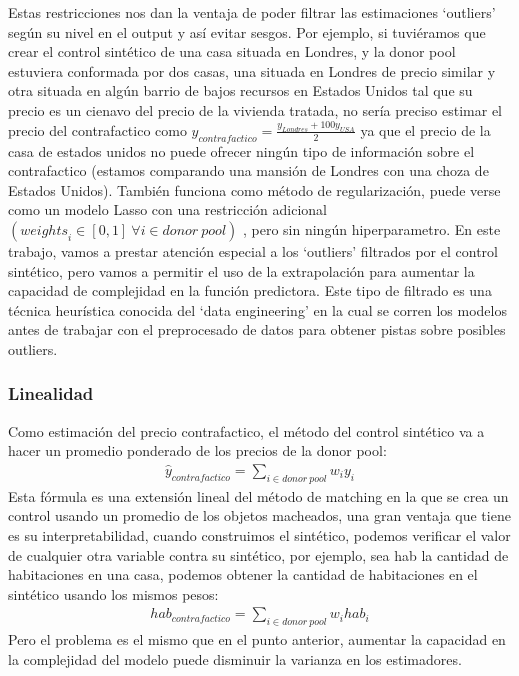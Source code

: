\documentclass[12pt]{article}
\begin{document}
Estas restricciones nos dan la ventaja de poder filtrar las estimaciones ‘outliers’ según su nivel en el output y así evitar sesgos. Por ejemplo, si tuviéramos que crear el control sintético de una casa situada en Londres, y la donor pool estuviera conformada por dos casas, una situada en Londres de precio similar y otra situada en algún barrio de bajos recursos en Estados Unidos tal que su precio es un cienavo del precio de la vivienda tratada, no sería preciso estimar el precio del contrafactico como {$ y_{contrafactico}=\frac{y_{Londres}+100y_{USA}}{2} $} ya que el precio de la casa de estados unidos no puede ofrecer ningún tipo de información sobre el contrafactico (estamos comparando una mansión de Londres con una choza de Estados Unidos).
También funciona como método de regularización, puede verse como un modelo Lasso con una restricción adicional
{$ ({weights}_i\in\left[0,1\right]\ \forall i\in donor\ pool) $} , pero sin ningún hiperparametro.
En este trabajo, vamos a prestar atención especial a los ‘outliers’ filtrados por el control sintético, pero vamos a permitir el uso de la extrapolación para aumentar la capacidad de complejidad en la función predictora.
Este tipo de filtrado es una técnica heurística conocida del ‘data engineering’ en la cual se corren los modelos antes de trabajar con el preprocesado de datos para obtener pistas sobre posibles outliers.

\subsubsection{Linealidad}
Como estimación del precio contrafactico, el método del control sintético va a hacer un promedio ponderado de los precios de la donor pool:
\begin{align*}
    {\hat{y}}_{contrafactico}=\sum_{i\in d o n o r\ pool}{w_iy_i}
\end{align*}
Esta fórmula es una extensión lineal del método de matching en la que se crea un control usando un promedio de los objetos macheados, una gran ventaja que tiene es su interpretabilidad, cuando construimos el sintético, podemos verificar el valor de cualquier otra variable contra su sintético, por ejemplo, sea hab la cantidad de habitaciones en una casa, podemos obtener la cantidad de habitaciones en el sintético usando los mismos pesos: 
\begin{align*}
    {hab}_{contrafactico}=\sum_{i\in d o n o r\ pool}{w_i{hab}_i}
\end{align*}
Pero el problema es el mismo que en el punto anterior, aumentar la capacidad en la complejidad del modelo puede disminuir la varianza en los estimadores.
\end{document}
